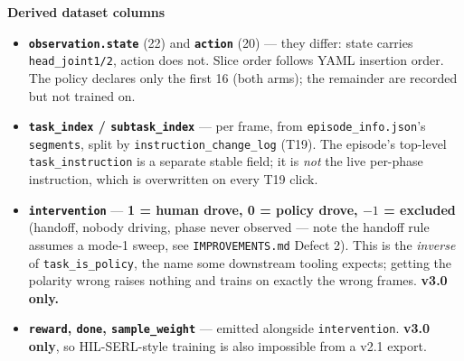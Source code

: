 \documentclass{article}
\begin{document}
\vspace{2mm}
{\large\bfseries Derived dataset columns}\\[2mm]
\begin{itemize}[leftmargin=6mm,itemsep=1.2mm]
\item \textbf{\texttt{observation.state}} (22) and \textbf{\texttt{action}} (20) --- they differ: state carries \texttt{head\_joint1/2}, action does not. Slice order follows YAML insertion order. The policy declares only the first 16 (both arms); the remainder are recorded but not trained on.
\item \textbf{\texttt{task\_index} / \texttt{subtask\_index}} --- per frame, from \texttt{episode\_info.json}'s \texttt{segments}, split by \texttt{instruction\_change\_log} (T19). The episode's top-level \texttt{task\_instruction} is a separate stable field; it is \emph{not} the live per-phase instruction, which is overwritten on every T19 click.
\item \textbf{\texttt{intervention}} --- \textbf{1 = human drove, 0 = policy drove, $-1$ = excluded} (handoff, nobody driving, phase never observed --- note the handoff rule assumes a mode-1 sweep, see \texttt{IMPROVEMENTS.md} Defect 2). This is the \emph{inverse} of \texttt{task\_is\_policy}, the name some downstream tooling expects; getting the polarity wrong raises nothing and trains on exactly the wrong frames. \textbf{v3.0 only.}
\item \textbf{\texttt{reward}, \texttt{done}, \texttt{sample\_weight}} --- emitted alongside \texttt{intervention}. \textbf{v3.0 only}, so HIL-SERL-style training is also impossible from a v2.1 export.
\end{itemize}
\end{document}
